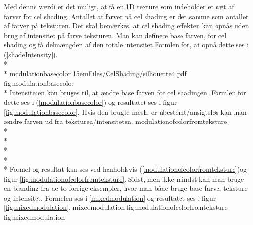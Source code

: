 Med denne værdi er det muligt, at få en 1D texture som indeholder et sæt af farver for cel shading. Antallet af farver på cel shading er det samme som antallet af farver på teksturen. Det skal bemærkes, at cel shading effekten kan opnås uden brug af intensitet på farve teksturen. 
Man kan definere base farven, for cel shading og få delmængden af den totale intensitet.Formlen for, at opnå dette ses i (\ref{shadeIntensity}).\\* \\*  {modulationbasecolor} 
 {15em}{Files/CelShading/silhouette4.pdf} {} {fig:modulationbasecolor}\\* Intensiteten kan bruges til, at ændre base farven for cel shadingen. Formlen for dette ses i (\ref{modulationbasecolor}) og resultatet ses i figur \ref{fig:modulationbasecolor}. 
Hvis den brugte mesh, er ubestemt/ansigtsløs kan man ændre farven ud fra teksturen/intensiteten. {modulationofcolorfromteksture}
\\*\\*\\*\\*\\* Formel og resultat kan ses ved henholdsvis (\ref{modulationofcolorfromteksture})og figur \ref{fig:modulationofcolorfromteksture}. Sidst, men ikke mindst kan man bruge en blanding fra de to forrige eksempler, hvor man både bruge base farve, teksture og intensitet. Formelen ses i \ref{mixedmodulation} og resultatet ses i figur \ref{fig:mixedmodulation}.
 {mixedmodulation}
\newpage%
 {fig:modulationofcolorfromteksture}
 {fig:mixedmodulation}
